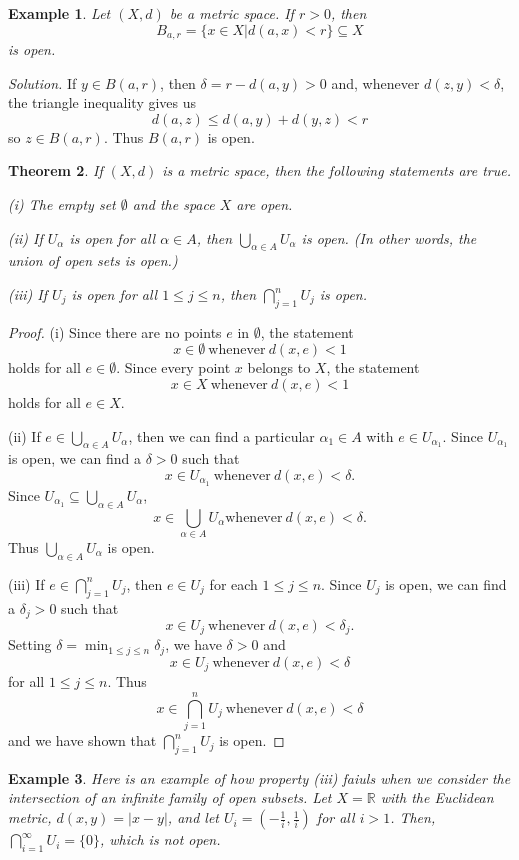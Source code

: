 \documentclass[12pt,a4paper]{article}
\theoremstyle{plain}
\newtheorem{theorem}{Theorem}[section]
\newtheorem{example}[theorem]{Example}
\begin{document}
\begin{example}
    Let $(X,d)$ be a metric space. If $r>0$, then 
\begin{equation}
    B_{a,r}=\{x\in X | d(a,x) < r\} \subseteq X
\end{equation}
is open. 
\end{example}
\noindent\emph{Solution. }
If $y\in B(a,r)$, then 
$\delta=r-d(a,y)>0$ and,
whenever $d(z,y)<\delta$,
the triangle inequality gives us
\[d(a,z)\leq d(a,y)+d(y,z)<r\]
so $z\in B(a,r)$. Thus $B(a,r)$ is open.

\begin{theorem}
    If $(X,d)$ is a metric space, then the following statements are true.

(i) The empty set $\emptyset$ and the space $X$ are open.

(ii) If $U_{\alpha}$ is open for all $\alpha\in A$, then $\bigcup_{\alpha\in A} U_{\alpha}$ is open. (In other words, the union of open sets is open.)

(iii) If $U_{j}$ is open for all $1\leq j\leq n$, then $\bigcap_{j=1}^{n} U_{j}$ is open.
\end{theorem}
\begin{proof}
    (i) Since there are no points $e$ in $\emptyset$, the statement
\[x\in \emptyset\ \text{whenever}\ d(x,e)<1\]
holds for all $e\in \emptyset$. Since every point $x$ belongs to $X$,
the statement
\[x\in X\ \text{whenever}\ d(x,e)<1\]
holds for all $e\in X$.

(ii) If $e\in \bigcup_{\alpha\in A} U_{\alpha}$, then we can find
a particular $\alpha_{1}\in A$ with $e\in U_{\alpha_{1}}$.
Since $U_{\alpha_{1}}$ is open, we can find a $\delta>0$
such that
\[x\in U_{\alpha_{1}}\ \text{whenever}\ d(x,e)<\delta.\]
Since $U_{\alpha_{1}}\subseteq \bigcup_{\alpha\in A} U_{\alpha}$,
\[x\in \bigcup_{\alpha\in A} U_{\alpha}  \text{whenever}\ d(x,e)<\delta.\]
Thus $\bigcup_{\alpha\in A} U_{\alpha}$ is open.

(iii) If $e\in \bigcap_{j=1}^{n} U_{j}$, then
$e\in U_{j}$ for each $1\leq j\leq n$. Since
$U_{j}$ is open, we can find a $\delta_{j}>0$
such that
\[x\in U_{j}\ \text{whenever}\ d(x,e)<\delta_{j}.\]
Setting $\delta=\min_{1\leq j\leq n}\delta_{j}$, we
have $\delta>0$ and
\[x\in U_{j}\ \text{whenever}\ d(x,e)<\delta\]
for all $1\leq j\leq n $. Thus
\[x\in \bigcap_{j=1}^{n} U_{j}\ \text{whenever}\ d(x,e)<\delta\]
and we have shown that $\bigcap_{j=1}^{n} U_{j}$ is open.
\end{proof}

\begin{example}
    Here is an example of how property (iii) faiuls when we consider the intersection of an infinite family of open subsets. Let $X=\mathbb{R}$ with the Euclidean metric, $d(x,y)=|x-y|$, and let $U_i=(-\frac{1}{i},\frac{1}{i})$ for all $i>1$. Then, $\bigcap_{i=1}^\infty U_i=\{0\}$, which is not open. 
\end{example}
\end{document}
